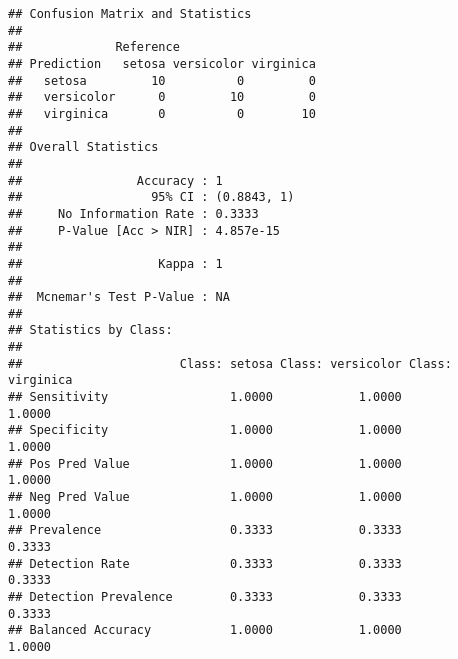 \documentclass[
]{article}
\begin{document}
\begin{verbatim}
## Confusion Matrix and Statistics
## 
##             Reference
## Prediction   setosa versicolor virginica
##   setosa         10          0         0
##   versicolor      0         10         0
##   virginica       0          0        10
## 
## Overall Statistics
##                                      
##                Accuracy : 1          
##                  95% CI : (0.8843, 1)
##     No Information Rate : 0.3333     
##     P-Value [Acc > NIR] : 4.857e-15  
##                                      
##                   Kappa : 1          
##                                      
##  Mcnemar's Test P-Value : NA         
## 
## Statistics by Class:
## 
##                      Class: setosa Class: versicolor Class: virginica
## Sensitivity                 1.0000            1.0000           1.0000
## Specificity                 1.0000            1.0000           1.0000
## Pos Pred Value              1.0000            1.0000           1.0000
## Neg Pred Value              1.0000            1.0000           1.0000
## Prevalence                  0.3333            0.3333           0.3333
## Detection Rate              0.3333            0.3333           0.3333
## Detection Prevalence        0.3333            0.3333           0.3333
## Balanced Accuracy           1.0000            1.0000           1.0000
\end{verbatim}
\end{document}
